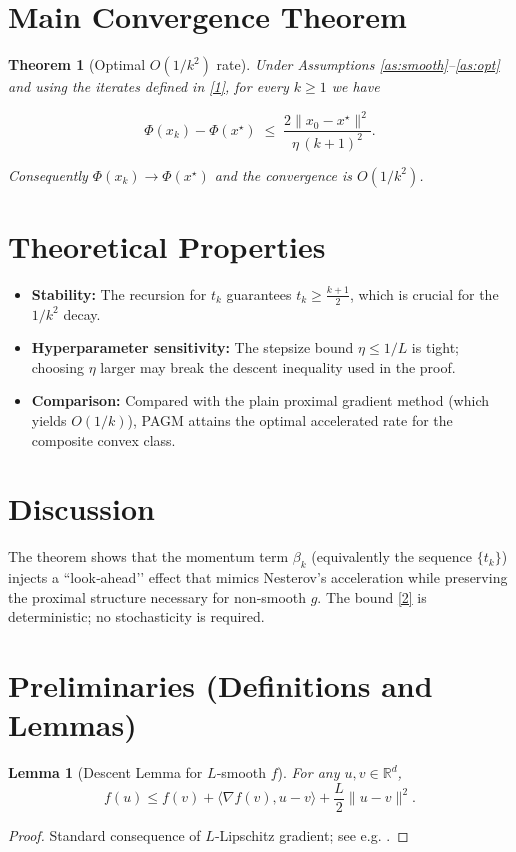 \documentclass{article}
\newtheorem{theorem}{Theorem}
\newtheorem{lemma}{Lemma}
\newcommand{\R}{\mathbb{R}}
\begin{document}
\section*{Main Convergence Theorem}
\begin{theorem}[Optimal $O(1/k^{2})$ rate]\label{thm:rate}
Under Assumptions \ref{as:smooth}–\ref{as:opt} and using the iterates defined in \eqref{1}, for every $k\ge 1$ we have  

\[
\Phi(x_{k})- \Phi(x^{\star})\;\le\;
\frac{2\|x_{0}-x^{\star}\|^{2}}{\eta\, (k+1)^{2}} .
\tag{2}
\]

Consequently $\Phi(x_{k})\to\Phi(x^{\star})$ and the convergence is $O(1/k^{2})$.
\end{theorem}

\section*{Theoretical Properties}
\begin{itemize}
\item \textbf{Stability:} The recursion for $t_k$ guarantees $t_k\ge \frac{k+1}{2}$, which is crucial for the $1/k^{2}$ decay.
\item \textbf{Hyperparameter sensitivity:} The stepsize bound $\eta\le 1/L$ is tight; choosing $\eta$ larger may break the descent inequality used in the proof.
\item \textbf{Comparison:} Compared with the plain proximal gradient method (which yields $O(1/k)$), PAGM attains the optimal accelerated rate for the composite convex class.
\end{itemize}

\section*{Discussion}
The theorem shows that the momentum term $\beta_k$ (equivalently the sequence $\{t_k\}$) injects a “look‑ahead’’ effect that mimics Nesterov’s acceleration while preserving the proximal structure necessary for non‑smooth $g$. The bound \eqref{2} is deterministic; no stochasticity is required.

\newpage
\section*{Preliminaries (Definitions and Lemmas)}
\begin{lemma}[Descent Lemma for $L$‑smooth $f$]\label{lem:descent}
For any $u,v\in\R^{d}$,
\[
f(u)\le f(v)+\langle \nabla f(v),u-v\rangle+\frac{L}{2}\|u-v\|^{2}.
\tag{3}
\]
\end{lemma}
\begin{proof}
Standard consequence of $L$‑Lipschitz gradient; see e.g. \cite{Nesterov2004}.
\end{proof}
\end{document}

